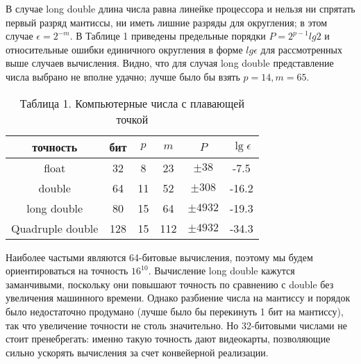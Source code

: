 В случае long double длина числа равна линейке процессора и нельзя ни
спрятать первый разряд мантиссы, ни иметь лишние разряды для округления; в
этом случае $\epsilon = 2^{-m}$. В Таблице 1 приведены предельные порядки $P = 2^{p-1}lg2$ и
относительные ошибки единичного округления в форме $lg\epsilon$ для
рассмотренных выше случаев вычисления. Видно, что для случая long double
представление числа выбрано не вполне удачно; лучше было бы взять $p = 14,m = 65$.

\begin{table}
\caption{Таблица 1. Компьютерные числа с плавающей точкой}
\begin{center}
\begin{tabular}{|c|c|c|c|c|c|}
\hline
точность & бит & $p$ & $m$ & $P$ & $\lg \epsilon$ \\
\hline
float & 32 & 8 & 23 & $\pm 38$ & -7.5 \\
double & 64 &  11 & 52 & $\pm 308$ & -16.2 \\
long double & 80 & 15 & 64 & $\pm 4932$ & -19.3\\
Quadruple double & 128 & 15 & 112 & $\pm 4932$ & -34.3 \\
\hline
\end{tabular}
\end{center}
\end{table}

Наиболее частыми являются 64-битовые вычисления, поэтому мы будем
ориентироваться на точность $16^10$. Вычисление long double кажутся
заманчивыми, поскольку они повышают точность по сравнению с double без
увеличения машинного времени. Однако разбиение числа на мантиссу и
порядок было недостаточно продумано (лучше было бы перекинуть 1 бит на
мантиссу), так что увеличение точности не столь значительно. Но 32-битовыми
числами не стоит пренебрегать: именно такую точность дают видеокарты,
позволяющие сильно ускорять вычисления за счет конвейерной реализации.